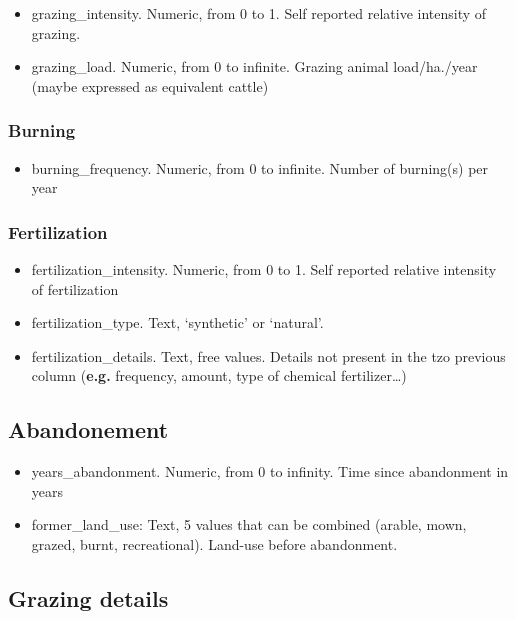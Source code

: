 \documentclass[table]{article}
\providecommand{\tightlist}{%
  \setlength{\itemsep}{0pt}\setlength{\parskip}{0pt}}
\begin{document}
\begin{itemize}
\tightlist
\item
  grazing\_intensity. Numeric, from 0 to 1. Self reported relative
  intensity of grazing.
\item
  grazing\_load. Numeric, from 0 to infinite. Grazing animal
  load/ha./year (maybe expressed as equivalent cattle)
\end{itemize}

\subsubsection{Burning}\label{burning-1}

\begin{itemize}
\tightlist
\item
  burning\_frequency. Numeric, from 0 to infinite. Number of burning(s)
  per year
\end{itemize}

\subsubsection{Fertilization}\label{fertilization-1}

\begin{itemize}
\tightlist
\item
  fertilization\_intensity. Numeric, from 0 to 1. Self reported relative
  intensity of fertilization
\item
  fertilization\_type. Text, `synthetic' or `natural'.
\item
  fertilization\_details. Text, free values. Details not present in the
  tzo previous column (\textbf{e.g.} frequency, amount, type of chemical
  fertilizer\ldots{})
\end{itemize}

\subsection{Abandonement}\label{abandonement}

\begin{itemize}
\tightlist
\item
  years\_abandonment. Numeric, from 0 to infinity. Time since
  abandonment in years
\item
  former\_land\_use: Text, 5 values that can be combined (arable, mown,
  grazed, burnt, recreational). Land-use before abandonment.
\end{itemize}

\subsection{Grazing details}\label{grazing-details}
\end{document}

